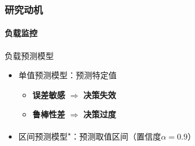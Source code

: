 \begin{frame}
\frametitle{研究动机}
\framesubtitle{负载监控}
\begin{block}{负载预测模型}
\begin{itemize}
    \item<1-1> 单值预测模型：预测特定值
    \begin{itemize}
        \item<1-1> \textbf{误差敏感} $\Rightarrow$ \textbf{决策失效}
        \item<1-1> \textbf{鲁棒性差} $\Rightarrow$ \textbf{决策过度}
    \end{itemize}
    \item<2-2> 区间预测模型\textsuperscript{$\star$}：预测取值区间（置信度$\alpha=0.9$）
\end{itemize}
\end{block}


\end{frame}
